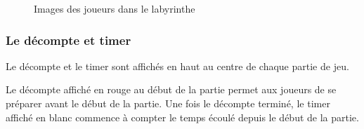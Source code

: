\begin{figure}[!htb]
    \qquad
    \qquad
    \caption{Images des joueurs dans le labyrinthe}
\end{figure}

\subsubsection*{Le décompte et timer}

Le décompte et le timer sont affichés en haut au centre de chaque partie de jeu.

Le décompte affiché en rouge au début de la partie permet aux joueurs de se préparer avant le début de la partie. Une fois le décompte terminé, le timer affiché en blanc commence à compter le temps écoulé depuis le début de la partie.


